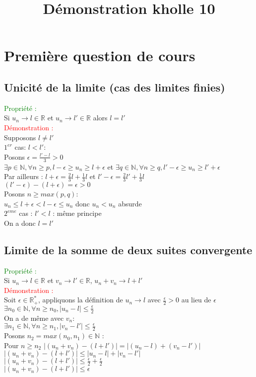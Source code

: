 \documentclass{article}
\begin{document}
\title{Démonstration kholle 10}
\date{}
\maketitle
	\renewcommand{\thesection}{\Roman{section}}
	\setlength{\parindent}{1.5cm}
\section{Première question de cours}
\subsection{Unicité de la limite (cas des limites finies)}
\textcolor{green}{Propriété :} \\
Si $u_n \rightarrow l\in \mathbb{R}$ et $u_n \rightarrow l'\in \mathbb{R}$ alors $l=l'$ \\ 
\textcolor{red}{Démonstration :} \\ 
Supposons $l \neq l'$ \\ 
$1^{er}$ cas: $l<l'$: \\ 
Posons $\epsilon=\frac{l'-l}{3}>0$ \\ 
$\exists p \in \mathbb{N}, \forall n \geq p, l- \epsilon \geq u_n \geq l+ \epsilon $ et $\exists q \in \mathbb{N}, \forall n \geq q, l'- \epsilon \geq u_n \geq l'+ \epsilon $ \\ 
Par ailleurs : $l+ \epsilon = \frac{2}{3}l+\frac{1}{3}l$ et $l'- \epsilon = \frac{2}{3}l'+\frac{1}{3}l$\\
$(l'-\epsilon )-(l+\epsilon)=\epsilon>0$ \\ 
Posons $n \geq max(p,q)$: \\ 
$u_n \leq l+ \epsilon < l- \epsilon \leq u_n$ donc $u_n < u_n$ absurde \\ 
$2^{eme}$ cas : $l'<l$ : même principe  \\ 
On a donc $l=l'$
\subsection{Limite de la somme de deux suites convergente}
\textcolor{green}{Propriété :} \\ 
Si $u_n \rightarrow l \in \mathbb{R}$ et $v_n \rightarrow l' \in \mathbb{R}$, $u_n+v_n \rightarrow l + l'$ \\ 
\textcolor{red}{Démonstration :} \\ 
Soit $\epsilon \in \mathbb{R}^*_+$, appliquons la définition de $u_n \rightarrow l$ avec $\frac{\epsilon}{2}>0$ au lieu de $\epsilon$ \\ 
$\exists n_0 \in \mathbb{N}, \forall n \geq n_0, |u_n-l| \leq \frac{\epsilon}{2}$ \\ 
On a de même avec $v_n$: \\
$\exists n_1 \in \mathbb{N}, \forall n \geq n_1, |v_n-l'| \leq \frac{\epsilon}{2}$ \\ 
Posons $n_2=max(n_0,n_1) \in \mathbb{N}$ : \\ 
Pour $n \geq n_2$
$|(u_n+v_n)-(l+l')|=|(u_n-l)+(v_n-l')|$ \\ 
$|(u_n+v_n)-(l+l')| \leq |u_n-l| + |v_n-l'|$ \\ 
$|(u_n+v_n)-(l+l')| \leq \frac{\epsilon}{2} + \frac{\epsilon}{2}$ \\ 
$|(u_n+v_n)-(l+l')| \leq \epsilon$
\end{document}
